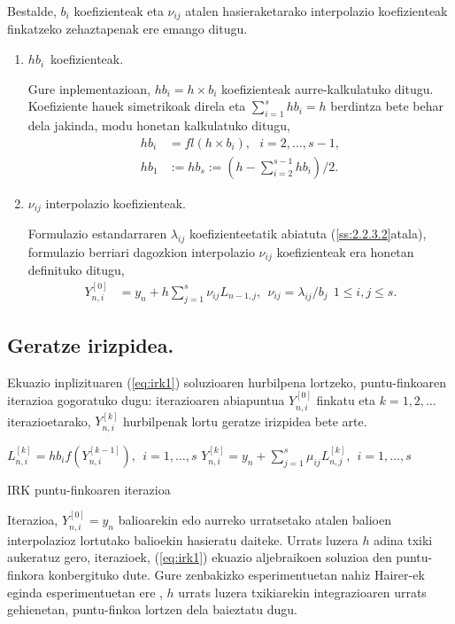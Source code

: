 Bestalde, $b_i$ koefizienteak eta $\nu_{ij}$ atalen hasieraketarako interpolazio koefizienteak finkatzeko zehaztapenak ere emango ditugu.
\begin{enumerate}
\item $hb_{i}$~koefizienteak.

Gure inplementazioan, $hb_i=h \times b_i$ koefizienteak aurre-kalkulatuko ditugu. Koefiziente hauek simetrikoak direla eta  $\sum\limits_{i=1}^{s} hb_i=h$ berdintza bete behar dela jakinda, modu honetan kalkulatuko ditugu,
\begin{align*}
hb_i & = fl(h \times b_i), \ \ \ i=2,\dots,s-1, \\
hb_1 & :=hb_s:= \left(h - \sum\limits_{i=2}^{s-1} hb_i \right)/2.
\end{align*}

\item $\nu_{ij}$ interpolazio koefizienteak.

Formulazio estandarraren $\lambda_{ij}$ koefizienteetatik abiatuta (\ref{ss:2.2.3.2}atala), formulazio berriari dagozkion interpolazio $\nu_{ij}$ koefizienteak era honetan definituko ditugu,
\begin{align}
\label{eq: interpLi}
Y_{n,i}^{[0]} &= y_n+ h \sum\limits_{j=1}^{s} \nu_{ij} L_{n-1,j}, \ \ \nu_{ij}=\lambda_{ij}/b_j \ \ 1\leqslant i,j \leqslant s.
\end{align} 

\end{enumerate}

\subsection{Geratze irizpidea.}

Ekuazio inplizituaren (\ref{eq:irk1}) soluzioaren hurbilpena lortzeko, puntu-finkoaren iterazioa gogoratuko dugu: iterazioaren abiapuntua $Y_{n,i}^{[0]}$  finkatu eta $k=1,2,\dots$ iterazioetarako, $Y_{n,i}^{[k]}$ hurbilpenak lortu geratze irizpidea bete arte.


\begin{algorithm}[H]
  {
  \BlankLine
   $L_{n,i}^{[k]}=hb_if(Y_{n,i}^{[k-1]}), \ \  i=1,\dots,s $\;
   $Y_{n,i}^{[k]}=y_n+\sum\limits_{j=1}^{s} \mu_{ij} L_{n,j}^{[k]} , \ \  i=1,\dots,s $\; 
   }
 \caption{IRK puntu-finkoaren iterazioa}
 \label{alg:pf}
\end{algorithm}
 
Iterazioa,  $Y_{n,i}^{[0]}=y_n$ balioarekin edo aurreko urratsetako atalen balioen interpolazioz lortutako balioekin \cite{Hairer2006}  hasieratu daiteke.  Urrats luzera $h$ adina txiki aukeratuz gero, iterazioek, (\ref{eq:irk1}) ekuazio aljebraikoen  soluzioa den puntu-finkora konbergituko dute. Gure zenbakizko esperimentuetan nahiz Hairer-ek eginda esperimentuetan ere \cite{Hairer2008}, $h$ urrats luzera txikiarekin integrazioaren urrats gehienetan, puntu-finkoa lortzen dela baieztatu dugu.    
 
